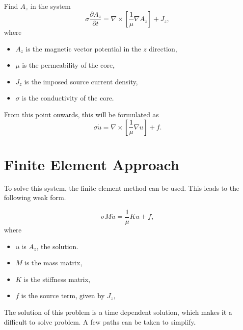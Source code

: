 \begin{problem}
    Find $A_z$ in the system
    \begin{equation}
        \sigma\frac{\partial A_z}{\partial t} = \nabla \times \left[\frac{1}{\mu}\nabla A_z\right] + J_z,
    \end{equation}
    where
    \begin{itemize}
        \item $A_z$ is the magnetic vector potential in the $z$ direction,
        \item $\mu$ is the permeability of the core,
        \item $J_z$ is the imposed source current density,
        \item $\sigma$ is the conductivity of the core.
    \end{itemize}
    From this point onwards, this will be formulated as
    \begin{equation}
        \sigma\dot u = \nabla \times \left[\frac{1}{\mu}\nabla u\right] + f.
    \end{equation}
\end{problem}

\newpage
\section{Finite Element Approach}
To solve this system, the finite element method can be used. This leads to the following weak form.
\begin{weakform}
    \begin{equation*}
        \sigma M \dot u = \frac{1}{\mu}K u + f,
    \end{equation*}
    where
    \begin{itemize}
        \item $u$ is $A_z$, the solution.
        \item $M$ is the mass matrix,
        \item $K$ is the stiffness matrix,
        \item $f$ is the source term, given by $J_z$,
    \end{itemize}
\end{weakform}
The solution of this problem is a time dependent solution, which makes it a difficult to solve problem. A few paths can be taken to simplify.